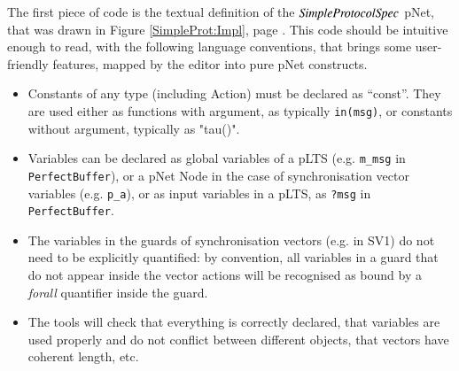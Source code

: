 \documentclass{elsarticle}
\newcommand{\TODO}[1]{\textcolor{red}{\textbf{[TODO:#1]}}}
\begin{document}


  

The first piece of code is the textual definition of the $\symb{SimpleProtocolSpec}$
pNet, that was drawn in Figure \ref{SimpleProt:Impl}, page \pageref{SimpleProt:Impl}. This code should be intuitive enough to read, with the following
language conventions, that brings some user-friendly features, mapped by the editor into pure pNet constructs.

\begin{itemize}
  \item Constants of any type (including Action) must be declared as
    ``const''. They are used either as functions with argument, as
    typically \texttt{in(msg)}, or constants without argument, typically as "tau()".
  \item Variables can be declared as global variables of a pLTS (e.g. \texttt{m\_msg} in \texttt{PerfectBuffer}), or a pNet Node in the case of synchronisation vector variables (e.g. \texttt{p\_a}),
    or as input variables in a pLTS, as \texttt{?msg} in \texttt{PerfectBuffer}.
  \item The variables in the guards of synchronisation vectors (e.g. in SV1) do not need to be explicitly quantified: by convention, all variables in a guard that do not appear inside the vector actions will be recognised as bound by a \emph{forall} quantifier inside the guard.
    \item The tools will check that everything is correctly declared, that variables are used properly and do not conflict between different objects, that vectors have coherent length, etc.
\end{itemize}
\bigskip
\end{document}

